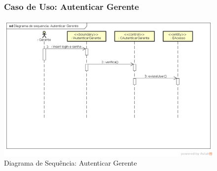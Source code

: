 \documentclass[
	12pt,				%
	openright,
	oneside,			%
	a4paper,			%
	chapter=TITLE,		%
	brazil				%
	]{abntex2}
\begin{document}
\begin{figure}[h!]

\subsubsection*{Caso de Uso: Autenticar Gerente}


	\caption{Diagrama de Sequência: Autenticar Gerente}
	\begin{center}
	    \includegraphics[scale=0.5]{Arquivos/Projeto/D_autenticar_gerente}  
	\end{center}
\end{figure}





\end{document}
